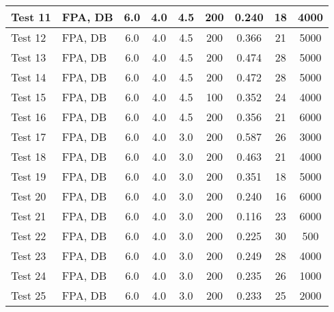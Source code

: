 \begin{table}[!ht]
\begin{center}
\begin{tabular}{|l|l|c|c|c|c|c|c|c|}
Test 11    &  FPA, DB           &  6.0       &  4.0       &  4.5       &  200            &  0.240          &  18                &  4000            \\ \hline
Test 12    &  FPA, DB           &  6.0       &  4.0       &  4.5       &  200            &  0.366          &  21                &  5000            \\ \hline
Test 13    &  FPA, DB           &  6.0       &  4.0       &  4.5       &  200            &  0.474          &  28                &  5000            \\ \hline
Test 14    &  FPA, DB           &  6.0       &  4.0       &  4.5       &  200            &  0.472          &  28                &  5000            \\ \hline
Test 15    &  FPA, DB           &  6.0       &  4.0       &  4.5       &  100            &  0.352          &  24                &  4000            \\ \hline
Test 16    &  FPA, DB           &  6.0       &  4.0       &  4.5       &  200            &  0.356          &  21                &  6000            \\ \hline
Test 17    &  FPA, DB           &  6.0       &  4.0       &  3.0       &  200            &  0.587          &  26                &  3000            \\ \hline
Test 18    &  FPA, DB           &  6.0       &  4.0       &  3.0       &  200            &  0.463          &  21                &  4000            \\ \hline
Test 19    &  FPA, DB           &  6.0       &  4.0       &  3.0       &  200            &  0.351          &  18                &  5000            \\ \hline
Test 20    &  FPA, DB           &  6.0       &  4.0       &  3.0       &  200            &  0.240          &  16                &  6000            \\ \hline
Test 21    &  FPA, DB           &  6.0       &  4.0       &  3.0       &  200            &  0.116          &  23                &  6000            \\ \hline
Test 22    &  FPA, DB           &  6.0       &  4.0       &  3.0       &  200            &  0.225          &  30                &  500             \\ \hline
Test 23    &  FPA, DB           &  6.0       &  4.0       &  3.0       &  200            &  0.249          &  28                &  4000            \\ \hline
Test 24    &  FPA, DB           &  6.0       &  4.0       &  3.0       &  200            &  0.235          &  26                &  1000            \\ \hline
Test 25    &  FPA, DB           &  6.0       &  4.0       &  3.0       &  200            &  0.233          &  25                &  2000            \\ \hline
\end{tabular}
\end{center}
\end{table}

